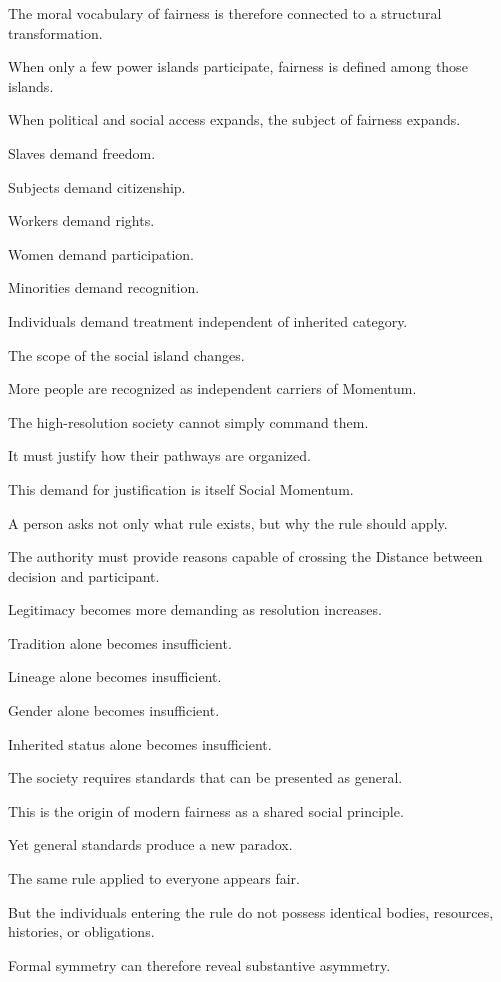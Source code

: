 The moral vocabulary of fairness is therefore connected to a structural transformation.

When only a few power islands participate, fairness is defined among those islands.

When political and social access expands, the subject of fairness expands.

Slaves demand freedom.

Subjects demand citizenship.

Workers demand rights.

Women demand participation.

Minorities demand recognition.

Individuals demand treatment independent of inherited category.

The scope of the social island changes.

More people are recognized as independent carriers of Momentum.

The high-resolution society cannot simply command them.

It must justify how their pathways are organized.

This demand for justification is itself Social Momentum.

A person asks not only what rule exists, but why the rule should apply.

The authority must provide reasons capable of crossing the Distance between decision and participant.

Legitimacy becomes more demanding as resolution increases.

Tradition alone becomes insufficient.

Lineage alone becomes insufficient.

Gender alone becomes insufficient.

Inherited status alone becomes insufficient.

The society requires standards that can be presented as general.

This is the origin of modern fairness as a shared social principle.

Yet general standards produce a new paradox.

The same rule applied to everyone appears fair.

But the individuals entering the rule do not possess identical bodies, resources, histories, or obligations.

Formal symmetry can therefore reveal substantive asymmetry.

